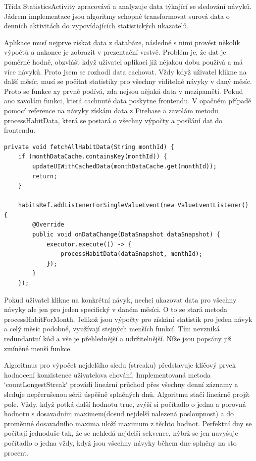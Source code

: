 Třída StatisticsActivity zpracovává a analyzuje data týkající se sledování návyků. Jádrem implementace jsou algoritmy schopné transformovat surová data o denních aktivitách do vypovídajících statistických ukazatelů.

Aplikace musí nejprve získat data z databáze, následně s nimi provést několik výpočtů a nakonec je zobrazit v prezentační vrstvě. Problém je, že dat je poměrně hodně, obzvlášť když uživatel aplikaci již nějakou dobu používá a má více návyků. Proto jsem se rozhodl data cachovat. Vždy když uživatel klikne na další měsíc, musí se počítat statistiky pro všechny viditelné návyky v daný měsíc. Proto se funkce xy prvně podívá, zda nejsou nějaká data v mezipaměti. Pokud ano zavolám funkci, která cachnuté data poskytne frontendu. V opačném případě pomocí reference na návyky získám data z Firebase a zavolám metodu processHabitData, která se postará o všechny výpočty a posílání dat do frontendu.

\begin{lstlisting}[style=javastyle,caption = {Data Cache},label = {lst:isHabitVisibleOnDate}]
private void fetchAllHabitData(String monthId) {
    if (monthDataCache.containsKey(monthId)) {
        updateUIWithCachedData(monthDataCache.get(monthId));
        return;
    }

    habitsRef.addListenerForSingleValueEvent(new ValueEventListener() {
        @Override
        public void onDataChange(DataSnapshot dataSnapshot) {
            executor.execute(() -> {
                processHabitData(dataSnapshot, monthId);
            });
        }
    });
\end{lstlisting}

Pokud uživatel klikne na konkrétní návyk, nechci ukazovat data pro všechny návyky ale jen pro jeden specifický v daném měsíci. O to se stará metoda processHabitForMonth. Jelikož jsou výpočty pro získání statistik pro jeden návyk a celý měsíc podobné, využívají stejných menších funkcí. Tím nevzniká redundantní kód a vše je přehlednější a udržitelnější. Níže jsou popsány již zmíněné menší funkce.

Algoritmus pro výpočet nejdelšího sledu (streaku) představuje klíčový prvek hodnocení konzistence uživatelova chování. Implementovaná metoda `countLongestStreak` provádí lineární průchod přes všechny denní záznamy a sleduje nepřerušenou sérii úspěšně splněných dnů. Algoritmu stačí lineárně projít pole. Vždy, když potká další hodnotu true, zvýší si počítadlo o jedna a porovná hodnotu s dosavadním maximem(dosud nejdelší nalezená posloupnost) a do proměnné dosavadního maxima uloží maximum z těchto hodnot. Perfektní dny se počítají jednoduše tak, že se nehledá nejdelší sekvence, nýbrž se jen navyšuje počítadlo o jedna vždy, když jsou všechny návyky během dne splněny na sto procent.

